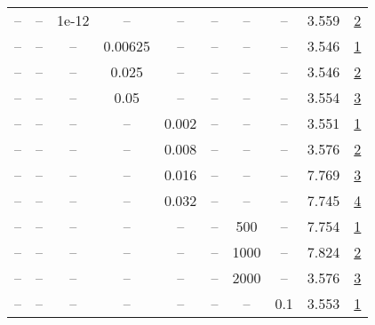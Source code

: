 \begin{table}[H]
\begin{tabular}{cccccccccc}
-- & -- & 1e-12 & -- & -- & -- & -- & -- & 3.559 & \href{https://wandb.ai/stanford-mercury/optimizer-scaling/runs/sweep-130m-2B-sophiaga7912flr0.004-wd0-minlr0-warmup4000-b10.95--7bc0d4}{2} \\
-- & -- & -- & 0.00625 & -- & -- & -- & -- & 3.546 & \href{https://wandb.ai/stanford-mercury/optimizer-scaling/runs/sweep-130m-2B-sophiag18e1e9lr0.004-wd0-minlr0-warmup4000-b10.95--77a1bd}{1} \\
-- & -- & -- & 0.025 & -- & -- & -- & -- & 3.546 & \href{https://wandb.ai/stanford-mercury/optimizer-scaling/runs/sweep-130m-2B-sophiage3d265lr0.004-wd0-minlr0-warmup4000-b10.95--b49616}{2} \\
-- & -- & -- & 0.05 & -- & -- & -- & -- & 3.554 & \href{https://wandb.ai/stanford-mercury/optimizer-scaling/runs/sweep-130m-2B-sophiag7b8220lr0.004-wd0-minlr0-warmup4000-b10.95--bcaa86}{3} \\
-- & -- & -- & -- & 0.002 & -- & -- & -- & 3.551 & \href{https://wandb.ai/stanford-mercury/optimizer-scaling/runs/sweep-130m-2B-sophiau26b00blr0.002-wd0-minlr0-warmup4000-b10.95--5fe952}{1} \\
-- & -- & -- & -- & 0.008 & -- & -- & -- & 3.576 & \href{https://wandb.ai/stanford-mercury/optimizer-scaling/runs/sweep-130m-2B-sophiag89efe6lr0.008-wd0-minlr0-warmup4000-b10.95--0cd475}{2} \\
-- & -- & -- & -- & 0.016 & -- & -- & -- & 7.769 & \href{https://wandb.ai/stanford-mercury/optimizer-scaling/runs/sweep-130m-2B-sophiag08e619lr0.016-wd0-minlr0-warmup4000-b10.95--9a3c93}{3} \\
-- & -- & -- & -- & 0.032 & -- & -- & -- & 7.745 & \href{https://wandb.ai/stanford-mercury/optimizer-scaling/runs/sweep-130m-2B-sophiag4429a5lr0.032-wd0-minlr0-warmup4000-b10.95--7aca97}{4} \\
-- & -- & -- & -- & -- & -- & 500 & -- & 7.754 & \href{https://wandb.ai/stanford-mercury/optimizer-scaling/runs/sweep-130m-2B-sophiagaa0223lr0.004-wd0-minlr0-warmup500-b10.95-b-4192ac}{1} \\
-- & -- & -- & -- & -- & -- & 1000 & -- & 7.824 & \href{https://wandb.ai/stanford-mercury/optimizer-scaling/runs/sweep-130m-2B-sophiaub0f459lr0.004-wd0-minlr0-warmup1000-b10.95--b2eac4}{2} \\
-- & -- & -- & -- & -- & -- & 2000 & -- & 3.576 & \href{https://wandb.ai/stanford-mercury/optimizer-scaling/runs/sweep-130m-2B-sophiau5e660clr0.004-wd0-minlr0-warmup2000-b10.95--2ad339}{3} \\
-- & -- & -- & -- & -- & -- & -- & 0.1 & 3.553 & \href{https://wandb.ai/stanford-mercury/optimizer-scaling/runs/sweep-130m-2B-sophiagb3dd57lr0.004-wd0.1-minlr0-warmup4000-b10.9-e0cbb7}{1} \\

\end{tabular}
\end{table}
